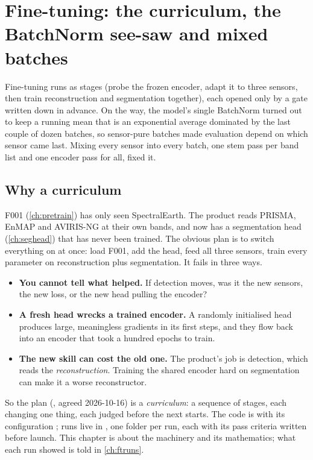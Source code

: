 \chapter{Fine-tuning: the curriculum, the BatchNorm see-saw and mixed batches}\label{ch:finetune}
\begingroup\setlength{\emergencystretch}{5em}%
\def\tbrk{\hfil\penalty50\hfilneg}%

\begin{onething}
Fine-tuning runs as stages (probe the frozen encoder, adapt it to three sensors, then train reconstruction and segmentation
together), each opened only by a gate written down in advance. On the way, the model's single BatchNorm turned out to keep a
running mean that is an exponential average dominated by the last couple of dozen batches, so sensor-pure batches made evaluation
depend on which sensor came last. Mixing every sensor into every batch, one stem pass per band list and one encoder pass for all,
fixed it.
\end{onething}

\section{Why a curriculum}\label{sec:finetune:why}

F001 (\cref{ch:pretrain}) has only seen SpectralEarth. The product reads PRISMA, EnMAP and AVIRIS-NG at their own bands, and now has
a segmentation head (\cref{ch:seghead}) that has never been trained. The obvious plan is to switch everything on at once: load F001,
add the head, feed all three sensors, train every parameter on reconstruction plus segmentation. It fails in three ways.
\begin{itemize}
  \item \textbf{You cannot tell what helped.} If detection moves, was it the new sensors, the new loss, or the new head pulling the encoder?
  \item \textbf{A fresh head wrecks a trained encoder.} A randomly initialised head produces large, meaningless gradients in its first steps,
    and they flow back into an encoder that took a hundred epochs to train.
  \item \textbf{The new skill can cost the old one.} The product's job is detection, which reads the \emph{reconstruction}. Training the shared
    encoder hard on segmentation can make it a worse reconstructor.
\end{itemize}
So the plan (, agreed 2026-10-16) is a \emph{curriculum}: a sequence of
stages, each changing one thing, each judged before the next starts. The code is 
with its configuration ; runs live in , one folder per run,
each with its pass criteria written before launch. This chapter is about the machinery and its mathematics; what each run showed is told
in \cref{ch:ftruns}.


